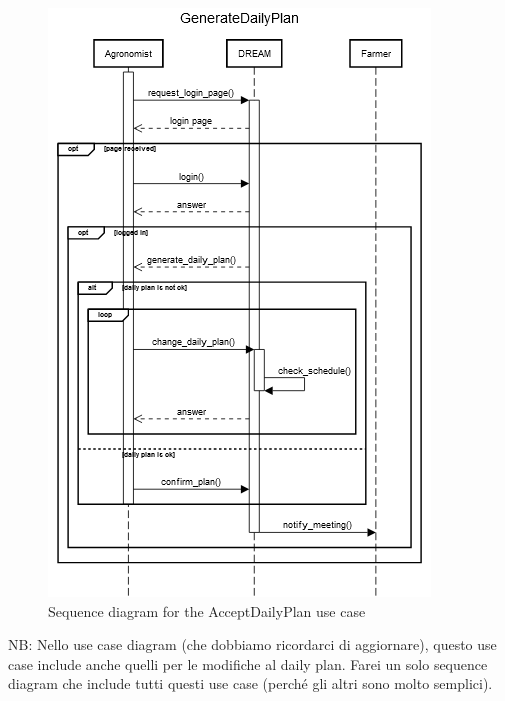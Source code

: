 \documentclass{article}
\begin{document}
\begin{figure}[H]
    \centering
    \includegraphics[scale=0.75]{sequence_diagrams/GenerateDailyPlan}
    \caption{Sequence diagram for the AcceptDailyPlan use case}
\end{figure}

\color{red}
NB: Nello use case diagram (che dobbiamo ricordarci di aggiornare), questo use case include anche quelli per le modifiche al daily plan. Farei un solo sequence diagram che include tutti questi use case (perché gli altri sono molto semplici).
\color{black}

\end{document}

